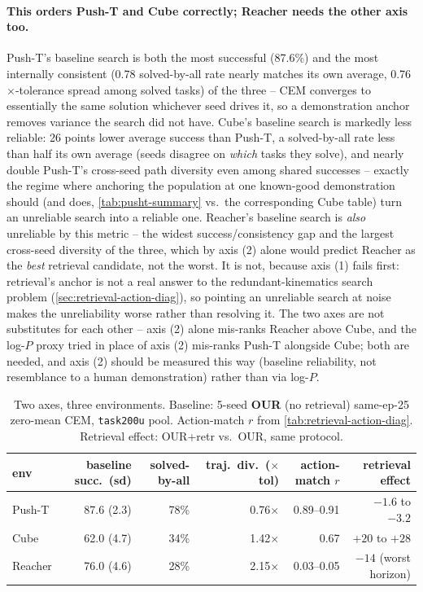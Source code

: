 \documentclass[11pt]{article}
\begin{document}
\paragraph{This orders Push-T and Cube correctly; Reacher needs the other axis too.}
Push-T's baseline search is both the most successful (87.6\%) and the most internally
consistent (0.78 solved-by-all rate nearly matches its own average, 0.76$\times$-tolerance
spread among solved tasks) of the three -- CEM converges to essentially the same solution
whichever seed drives it, so a demonstration anchor removes variance the search did not have.
Cube's baseline search is markedly less reliable: 26 points lower average success than
Push-T, a solved-by-all rate less than half its own average (seeds disagree on \emph{which}
tasks they solve), and nearly double Push-T's cross-seed path diversity even among shared
successes -- exactly the regime where anchoring the population at one known-good
demonstration should (and does, \cref{tab:pusht-summary} vs.\ the corresponding Cube table)
turn an unreliable search into a reliable one. Reacher's baseline search is \emph{also}
unreliable by this metric -- the widest success/consistency gap and the largest cross-seed
diversity of the three, which by axis (2) alone would predict Reacher as the \emph{best}
retrieval candidate, not the worst. It is not, because axis (1) fails first: retrieval's
anchor is not a real answer to the redundant-kinematics search problem
(\cref{sec:retrieval-action-diag}), so pointing an unreliable search at noise makes the
unreliability worse rather than resolving it. The two axes are not substitutes for each
other -- axis (2) alone mis-ranks Reacher above Cube, and the log-$P$ proxy tried in place of
axis (2) mis-ranks Push-T alongside Cube; both are needed, and axis (2) should be measured
this way (baseline reliability, not resemblance to a human demonstration) rather than via
log-$P$.

\begin{table}[H]
\centering\small
\caption{Two axes, three environments. Baseline: 5-seed \textbf{OUR} (no retrieval)
same-ep-25 zero-mean CEM, \texttt{task200u} pool. Action-match $r$ from
\cref{tab:retrieval-action-diag}. Retrieval effect: OUR+retr vs.\ OUR, same protocol.}
\label{tab:two-axes}
\begin{tabular}{lrrrrr}
\toprule
env & baseline succ.\ (sd) & solved-by-all & traj.\ div.\ ($\times$tol) & action-match $r$ & retrieval effect \\
\midrule
Push-T   & 87.6 (2.3) & 78\% & 0.76$\times$ & 0.89--0.91 & $-1.6$ to $-3.2$ \\
Cube     & 62.0 (4.7) & 34\% & 1.42$\times$ & 0.67       & $+20$ to $+28$   \\
Reacher  & 76.0 (4.6) & 28\% & 2.15$\times$ & 0.03--0.05 & $-14$ (worst horizon) \\
\bottomrule
\end{tabular}
\end{table}
\end{document}
